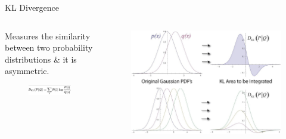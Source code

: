 \begin{frame}[allowframebreaks]{KL Divergence}
    \begin{columns}
    \begin{column}{0.4\textwidth}
        Measures the similarity between two probability distributions & it is asymmetric.

        \vspace{1em}

        \begin{figure}
            \centering
            \includegraphics[width=1\textwidth,keepaspectratio]{images/dul/dim-reduce/tsne-similarity.jpg}
        \end{figure}
    \end{column}
    \begin{column}{0.6\textwidth}
        \begin{figure}
            \centering
            \includegraphics[width=1\textwidth,keepaspectratio]{images/dul/dim-reduce/tsne-similarity-graph.jpg}
        \end{figure}
    \end{column}
    \end{columns}
\end{frame}

